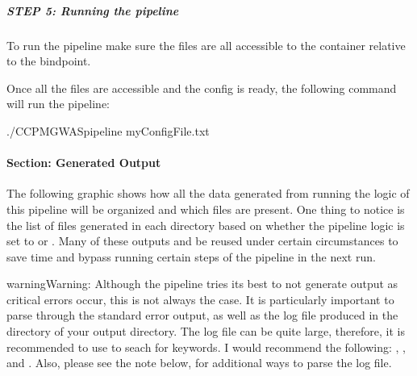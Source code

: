 \documentclass[letterpaper,10pt,english]{sphinxmanual}
\let\sphinxpxdimen\pdfpxdimen\else\newdimen\sphinxpxdimen
\begin{document}
\subparagraph{STEP 5: Running the pipeline}
\label{\detokenize{fullPipelineBinaryTutorial:step-5-running-the-pipeline}}
To run the pipeline make sure the files are all accessible to the container relative to the bindpoint.

Once all the files are accessible and the config is ready, the following command will run the pipeline:

\begin{sphinxVerbatim}[commandchars=\\\{\}]
\PYGZdl{} ./CCPM\PYGZus{}GWAS\PYGZus{}pipeline myConfigFile.txt
\end{sphinxVerbatim}


\paragraph{Section: Generated Output}
\label{\detokenize{fullPipelineBinaryTutorial:section-generated-output}}
The following graphic shows how all the data generated from running the logic of this pipeline will be organized and which files are present.  One thing to notice is the list of files generated in each directory based on whether the pipeline logic is set to  or .  Many of these outputs and be re\sphinxhyphen{}used under certain circumstances to save time and bypass running certain steps of the pipeline in the next run.
\begin{quote}

\noindent{\hspace*{\fill}\sphinxincludegraphics[width=1000\sphinxpxdimen]{{fullPipeline_output}.png}\hspace*{\fill}}
\end{quote}

\begin{sphinxadmonition}{warning}{Warning:}
 Although the pipeline tries its best to not generate output as critical errors occur, this is not always the case.  It is particularly important to parse through the standard error output, as well as the log file produced in the  directory of your output directory.  The log file can be quite large, therefore, it is recommended to use  to seach for keywords.  I would recommend the following: , , and .  Also, please see the note below, for additional ways to parse the log file.
\end{sphinxadmonition}
\end{document}
